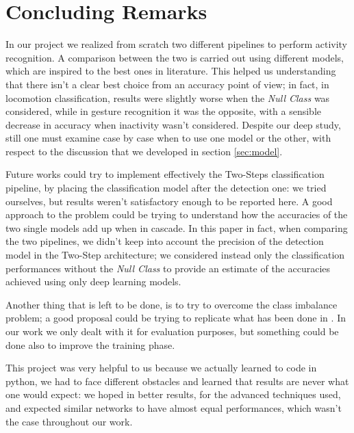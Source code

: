 
\section{Concluding Remarks}
\label{sec:conclusions}

In our project we realized from scratch two different pipelines to perform activity recognition. A comparison between the two is carried out using different models, which are inspired to the best ones in literature. This helped us understanding that there isn't a clear best choice from an accuracy point of view; in fact, in locomotion classification, results were slightly worse when the \textit{Null Class} was considered, while in gesture recognition it was the opposite, with a sensible decrease in accuracy when inactivity wasn't considered. Despite our deep study, still one must examine case by case when to use one model or the other, with respect to the discussion that we developed in section \ref{sec:model}.

Future works could try to implement effectively the Two-Steps classification pipeline, by placing the classification model after the detection one: we tried ourselves, but results weren’t satisfactory enough to be reported here. A good approach to the problem could be trying to understand how the accuracies of the two single models add up when in cascade. In this paper in fact, when comparing the two pipelines, we didn’t keep into account the precision of the detection model in the Two-Step architecture; we considered instead only the classification performances without the \textit{Null Class} to provide an estimate of the accuracies achieved using only deep learning models. 

Another thing that is left to be done, is to try to overcome the class imbalance problem; a good proposal could be trying to replicate what has been done in \cite{japkowicz2002class}. In our work we only dealt with it for evaluation purposes, but something could be done also to improve the training phase.

This project was very helpful to us because we actually learned to code in python, we had to face different obstacles and learned that results are never what one would expect: we hoped in better results, for the advanced techniques used, and expected similar networks to have almost equal performances, which wasn't the case throughout our work.